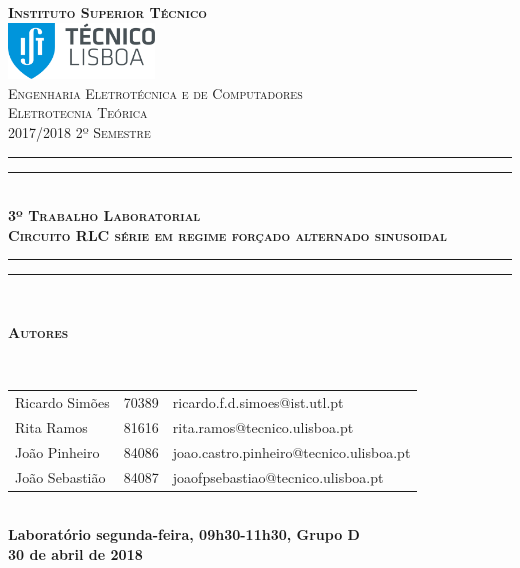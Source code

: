 \documentclass[a4paper, titlepage, portuguese]{article}
\begin{document}
	\begin{titlepage}
		\center
		\textsc{\bfseries\LARGE Instituto Superior Técnico}\\[1cm] %
		\includegraphics[height=1.5cm]{IST_Logo.pdf}\\[2.5cm]

		\textsc{\large Engenharia Eletrotécnica e de Computadores}\\[0.5cm] %
		\textsc{\Large Eletrotecnia Teórica}\\[0.5cm] %
		\textsc{\large 2017/2018 2º Semestre}\\[2cm]

		\rule{\textwidth}{1.6pt}\vspace*{-\baselineskip}\vspace*{2pt} %
		\rule{\textwidth}{0.4pt}\\[\baselineskip] %
			\textsc{\Huge \bfseries 3º Trabalho Laboratorial}\\[0.2cm]
			\bigskip
			\textsc{\large \bfseries Circuito RLC série em regime forçado alternado sinusoidal}\\[0.2cm]
		\rule{\textwidth}{0.4pt}\vspace*{-\baselineskip}\vspace{3.2pt} %
		\rule{\textwidth}{1.6pt}\\[6cm]

		\begin{minipage}{0.9\textwidth}
			\begin{flushleft} \large
				\begin{Large}\bfseries\textsc{Autores}\end{Large}\\[0.4cm]
				\begin{tabular}{l l l}
					Ricardo Simões	& 70389 & \normalsize ricardo.f.d.simoes@ist.utl.pt \\
					Rita Ramos			& 81616 & \normalsize rita.ramos@tecnico.ulisboa.pt \\
					João Pinheiro		& 84086 & \normalsize joao.castro.pinheiro@tecnico.ulisboa.pt \\
					João Sebastião	& 84087 & \normalsize joaofpsebastiao@tecnico.ulisboa.pt \\
				\end{tabular}
			\end{flushleft}
		\end{minipage}\\[0.5cm]

		\large \bfseries Laboratório segunda-feira, 09h30-11h30, Grupo D\\
		\large 30 de abril de 2018\\[1cm]
		\setcounter{page}{0}
	\end{titlepage}
\end{document}
